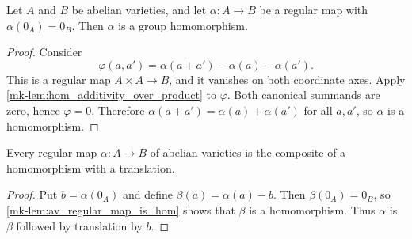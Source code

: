 \begin{lemma}
  \label{mk-lem:av_regular_map_is_hom}
  \leanok

  Let \(A\) and \(B\) be abelian varieties, and let \(\alpha\colon A\to B\) be a
  regular map with \(\alpha(0_A)=0_B\).  Then \(\alpha\) is a group homomorphism.
\end{lemma}
\begin{proof}
  \leanok
  Consider
  \[
    \varphi(a,a')=\alpha(a+a')-\alpha(a)-\alpha(a').
  \]
  This is a regular map \(A\times A\to B\), and it vanishes on both coordinate
  axes.  Apply \ref{mk-lem:hom_additivity_over_product} to \(\varphi\).  Both canonical
  summands are zero, hence \(\varphi=0\).  Therefore
  \(\alpha(a+a')=\alpha(a)+\alpha(a')\) for all \(a,a'\), so \(\alpha\) is a
  homomorphism.
\end{proof}

\begin{corollary}
  \label{mk-cor:av_regular_map_translation}
  Every regular map \(\alpha\colon A\to B\) of abelian varieties is the composite of
  a homomorphism with a translation.
\end{corollary}
\begin{proof}
  Put \(b=\alpha(0_A)\) and define \(\beta(a)=\alpha(a)-b\).  Then
  \(\beta(0_A)=0_B\), so \ref{mk-lem:av_regular_map_is_hom} shows that \(\beta\) is a
  homomorphism.  Thus \(\alpha\) is \(\beta\) followed by translation by \(b\).
\end{proof}
